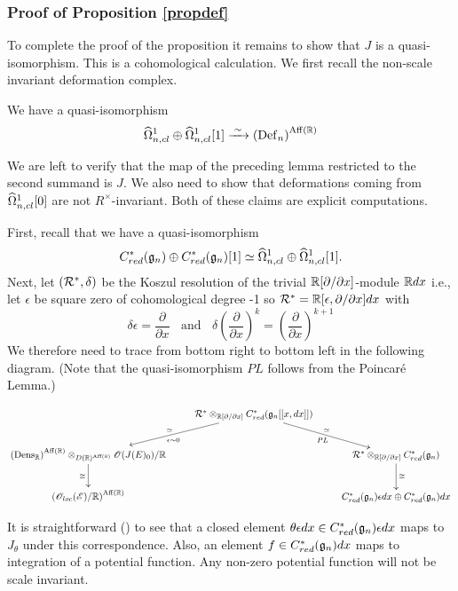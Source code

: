 \subsubsection{Proof of Proposition \ref{propdef}}

To complete the proof of the proposition it remains to show that $J$
is a quasi-isomorphism. This is a cohomological calculation. We first recall the non-scale invariant deformation complex.

\begin{lem}
We have a quasi-isomorphism
\[
\widehat{\Omega}^1_{n,cl} \oplus \widehat{\Omega}^1_{n,cl}[1] \xrightarrow{\; \sim \;} \left({\rm Def}_n\right)^{{\rm Aff}(\mathbb R)} 
\]
\end{lem}

We are left to verify that the map of the preceding lemma restricted to the second summand is $J$.  We also need to show that deformations coming from $\widehat{\Omega}^1_{n,cl} [0]$ are not $R^\times$-invariant. Both of these claims are explicit computations.  


First, recall that we have a quasi-isomorphism
\[
C^\ast_{red} (\mathfrak g_n) \oplus C^\ast_{red} (\mathfrak g_n) [1] \simeq \widehat{\Omega}^1_{n,cl} \oplus \widehat{\Omega}^1_{n,cl}[1].
\]
Next, let $(\mathcal R^\ast, \delta)$ be the Koszul resolution of the trivial $\mathbb R[\partial/\partial x]$-module $\mathbb R dx$ i.e., let $\epsilon$ be square zero of cohomological degree -1 so $\mathcal R^\ast = \mathbb R [\epsilon, \partial/\partial x] dx$ with 
\[
\delta \epsilon = \frac{\partial}{\partial x} \; \; \text{ and } \; \; \delta \left ( \frac{\partial}{\partial x} \right )^k = \left ( \frac{\partial}{\partial x} \right )^{k+1} 
\]
We therefore need to trace from bottom right to bottom left in the following diagram. (Note that the quasi-isomorphism $PL$ follows from the Poincar\'e Lemma.)

\begin{footnotesize}
\[
\xymatrix{ & \cR^\ast  \otimes_{\RR[\partial/\partial x]}   C^\ast_{red} (\fg_n [[x, dx]]) \ar[1,-1]_\simeq^{\epsilon \sim 0} \ar[1,1]^{\simeq}_{PL} &\\
 \left (\mathrm{Dens}_\RR \right )^{\Aff(\RR)} \otimes_{D(\RR)^{\Aff(\RR)}}  \sO(J(E)_0)/\RR \ar[d]_{\cong} &&\cR^\ast \otimes_{\RR[\partial/\partial x]} C^\ast_{red} (\fg_n) \ar[d]^{\cong} \\
 \left (\sO_{loc} (\sE)/\RR \right )^{\Aff(\RR)} && C^\ast_{red} (\fg_n) \epsilon dx \oplus C^\ast_{red} (\fg_n) dx
}
\]
\end{footnotesize}

It is straightforward () to see that a closed element $\theta \epsilon dx \in C^\ast_{red} (\mathfrak g_n) \epsilon dx$ maps to $J_\theta$ under this correspondence. Also, an element $f \in C^\ast_{red} (\mathfrak g_n)dx$ maps to integration of a potential function.  Any non-zero potential function will not be scale invariant.


